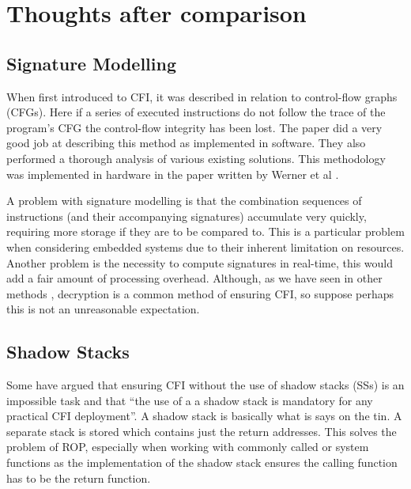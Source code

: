 \section{Thoughts after comparison}

\subsection{Signature Modelling}

When first introduced to CFI, it was described in relation to control-flow graphs (CFGs). Here if a series of executed instructions do not follow the trace of the program’s CFG the control-flow integrity has been lost. The paper \cite{Yang2013} did a very good job at describing this method as implemented in software. They also performed a thorough analysis of various existing solutions. This methodology was implemented in hardware in the paper written by Werner et al \cite{Werner2016}.

A problem with signature modelling is that the combination sequences of instructions (and their accompanying signatures) accumulate very quickly, requiring more storage if they are to be compared to. This is a particular problem when considering embedded systems due to their inherent limitation on resources. Another problem is the necessity to compute signatures in real-time, this would add a fair amount of processing overhead. Although, as we have seen in other methods \cite{Davi2015} \cite{Lee2019}, decryption is a common method of ensuring CFI, so suppose perhaps this is not an unreasonable expectation.

\subsection{Shadow Stacks}
Some \cite{Christoulakis2016} have argued that ensuring CFI without the use of shadow stacks (SSs) is an impossible task and that “the use of a a shadow stack is mandatory for any practical CFI deployment”. A shadow stack is basically what is says on the tin. A separate stack is stored which contains just the return addresses. This solves the problem of ROP, especially when working with commonly called or system functions as the implementation of the shadow stack ensures the calling function has to be the return function.

